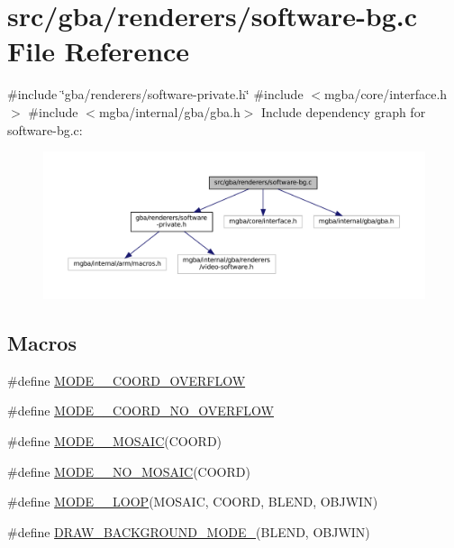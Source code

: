 \hypertarget{software-bg_8c}{}\section{src/gba/renderers/software-\/bg.c File Reference}
\label{software-bg_8c}
{\ttfamily \#include \char`\"{}gba/renderers/software-\/private.\+h\char`\"{}}\newline
{\ttfamily \#include $<$mgba/core/interface.\+h$>$}\newline
{\ttfamily \#include $<$mgba/internal/gba/gba.\+h$>$}\newline
Include dependency graph for software-\/bg.c\+:
\nopagebreak
\begin{figure}[H]
\begin{center}
\leavevmode
\includegraphics[width=350pt]{software-bg_8c__incl}
\end{center}
\end{figure}
\subsection*{Macros}
\begin{DoxyCompactItemize}
\item 
\#define \mbox{\hyperlink{software-bg_8c_a4d650cc71d278fc9352c80391eb2243a}{M\+O\+D\+E\+\_\+\_\+\+C\+O\+O\+R\+D\+\_\+\+O\+V\+E\+R\+F\+L\+OW}}
\item 
\#define \mbox{\hyperlink{software-bg_8c_a33b56251cddcc3943361a51d34aa7e6d}{M\+O\+D\+E\+\_\+\_\+\+C\+O\+O\+R\+D\+\_\+\+N\+O\+\_\+\+O\+V\+E\+R\+F\+L\+OW}}
\item 
\#define \mbox{\hyperlink{software-bg_8c_af363f69e67cd850494fefb9983f83cfd}{M\+O\+D\+E\+\_\+\_\+\+M\+O\+S\+A\+IC}}(C\+O\+O\+RD)
\item 
\#define \mbox{\hyperlink{software-bg_8c_a523cbe774cf992170ce1867f40de6981}{M\+O\+D\+E\+\_\+\_\+\+N\+O\+\_\+\+M\+O\+S\+A\+IC}}(C\+O\+O\+RD)
\item 
\#define \mbox{\hyperlink{software-bg_8c_a86cd3da091252309dee9b6499831ba25}{M\+O\+D\+E\+\_\+\_\+\+L\+O\+OP}}(M\+O\+S\+A\+IC,  C\+O\+O\+RD,  B\+L\+E\+ND,  O\+B\+J\+W\+IN)
\item 
\#define \mbox{\hyperlink{software-bg_8c_aeeccdce3997dcb6a4768873b8fbd1bdd}{D\+R\+A\+W\+\_\+\+B\+A\+C\+K\+G\+R\+O\+U\+N\+D\+\_\+\+M\+O\+D\+E\+\_}}(B\+L\+E\+ND,  O\+B\+J\+W\+IN)
\end{DoxyCompactItemize}
